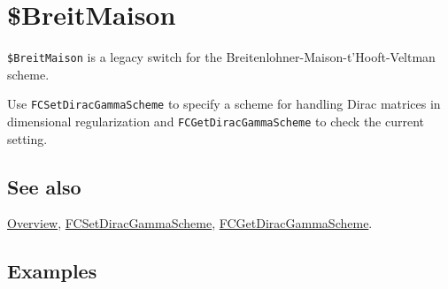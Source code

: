 \documentclass[../FeynCalcManual.tex]{subfiles}
\begin{document}
\hypertarget{breitmaison}{%
\section{\$BreitMaison}\label{breitmaison}}

\texttt{\$BreitMaison} is a legacy switch for the
Breitenlohner-Maison-t'Hooft-Veltman scheme.

Use \texttt{FCSetDiracGammaScheme} to specify a scheme for handling
Dirac matrices in dimensional regularization and
\texttt{FCGetDiracGammaScheme} to check the current setting.

\subsection{See also}

\hyperlink{toc}{Overview},
\hyperlink{fcsetdiracgammascheme}{FCSetDiracGammaScheme},
\hyperlink{fcgetdiracgammascheme}{FCGetDiracGammaScheme}.

\subsection{Examples}
\end{document}
